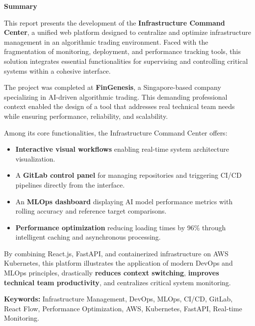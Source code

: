\begin{titlepage}
\begin{center}

\vspace*{3cm} %

\textbf{\Large Summary}

\vspace{1cm}

\begin{itshape}
This report presents the development of the \textbf{Infrastructure Command Center}, a unified web platform designed to centralize and optimize infrastructure management in an algorithmic trading environment. Faced with the fragmentation of monitoring, deployment, and performance tracking tools, this solution integrates essential functionalities for supervising and controlling critical systems within a cohesive interface.

The project was completed at \textbf{FinGenesis}, a Singapore-based company specializing in AI-driven algorithmic trading. This demanding professional context enabled the design of a tool that addresses real technical team needs while ensuring performance, reliability, and scalability.

Among its core functionalities, the Infrastructure Command Center offers:  
\begin{itemize}
    \item \textbf{Interactive visual workflows} enabling real-time system architecture visualization.  
    \item A \textbf{GitLab control panel} for managing repositories and triggering CI/CD pipelines directly from the interface.  
    \item An \textbf{MLOps dashboard} displaying AI model performance metrics with rolling accuracy and reference target comparisons.  
    \item \textbf{Performance optimization} reducing loading times by 96\% through intelligent caching and asynchronous processing.  
\end{itemize}

By combining React.js, FastAPI, and containerized infrastructure on AWS Kubernetes, this platform illustrates the application of modern DevOps and MLOps principles, drastically \textbf{reduces context switching}, \textbf{improves technical team productivity}, and centralizes critical system monitoring.

\vspace{0.5cm}

\noindent \textbf{Keywords:} Infrastructure Management, DevOps, MLOps, CI/CD, GitLab, React Flow, Performance Optimization, AWS, Kubernetes, FastAPI, Real-time Monitoring.
\end{itshape}

\vfill

\end{center}
\end{titlepage}
